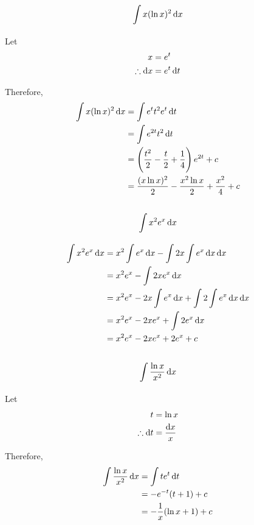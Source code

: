 \documentclass[fleqn, a4paper]{article}
\begin{document}
\subsection{\[\int x (\ln x)^2 \dif x\]}

Let
\begin{align*}
	x &= e^t\\
	\therefore \dif x &= e^t \dif t
\end{align*}

Therefore,
\begin{align*}
	\int x (\ln x)^2 \dif x &= \int e^t t^2 e^t \dif t\\
	&= \int e^{2t} t^2 \dif t\\
	&= \left( \dfrac{t^2}{2} - \dfrac{t}{2} + \dfrac{1}{4} \right) e^{2t} + c\\
	&= \dfrac{(x \ln x)^2}{2} - \dfrac{x^2 \ln x}{2} + \dfrac{x^2}{4} + c
\end{align*}

\subsection{\[\int x^2 e^x \dif x\]}

\begin{align*}
	\int x^2 e^x \dif x &= x^2 \int e^x \dif x - \int 2x \int e^x \dif x \dif x\\
	&= x^2 e^x - \int 2x e^x \dif x\\
	&= x^2 e^x - 2x \int e^x \dif x + \int 2 \int e^x \dif x \dif x\\
	&= x^2 e^x - 2x e^x + \int 2 e^x \dif x\\
	&= x^2 e^x - 2x e^x + 2 e^x + c
\end{align*}

\subsection{\[\int \dfrac{\ln x}{x^2} \dif x\]}

Let
\begin{align*}
	t &= \ln x\\
	\therefore \dif t &= \dfrac{\dif x}{x}
\end{align*}

Therefore,
\begin{align*}
	\int \dfrac{\ln x}{x^2} \dif x &= \int t e^t \dif t\\
	&= -e^{-t} (t + 1) + c\\
	&= -\dfrac{1}{x} (\ln x + 1) + c 
\end{align*}
\end{document}
